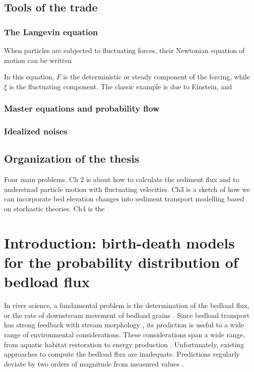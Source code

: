 \subsection{Tools of the trade}

\subsubsection{The Langevin equation}
When particles are subjected to fluctuating forces, their Newtonian equation of motion can be written

In this equation, $F$ is the deterministic or steady component of the forcing, while $\xi$ is the fluctuating component. 
The classic example is due to Einstein, and 
\subsubsection{Master equations and probability flow}

\subsubsection{Idealized noises}


\subsection{Organization of the thesis}

Four main problems. Ch 2 is about how to calculate the sediment flux and to understnad particle motion with fluctuating velocities.
Ch3 is a sketch of how we can incorporate bed elevation changes into sediment transport modelling based on stochastic theories.
Ch4 is the 

\section{Introduction: birth-death models for the probability distribution of bedload flux}

In river science, a fundamental problem is the determination of the bedload flux, or the rate of downstream movement of bedload grains \citep{Ballio2014}.
Since bedload transport has strong feedback with stream morphology \citep{Church2006, Recking2016}, its prediction is useful to a wide range of environmental considerations. 
These considerations span a wide range, from aquatic habitat restoration to energy production \citep{Kondolf2014, Wohl2015a}. 
Unfortunately, existing approaches to compute the bedload flux are inadequate. 
Predictions regularly deviate by two orders of magnitude from measured values \citep{Gomez1989, Barry2004, Bathurst2007a, Recking2012}. 


